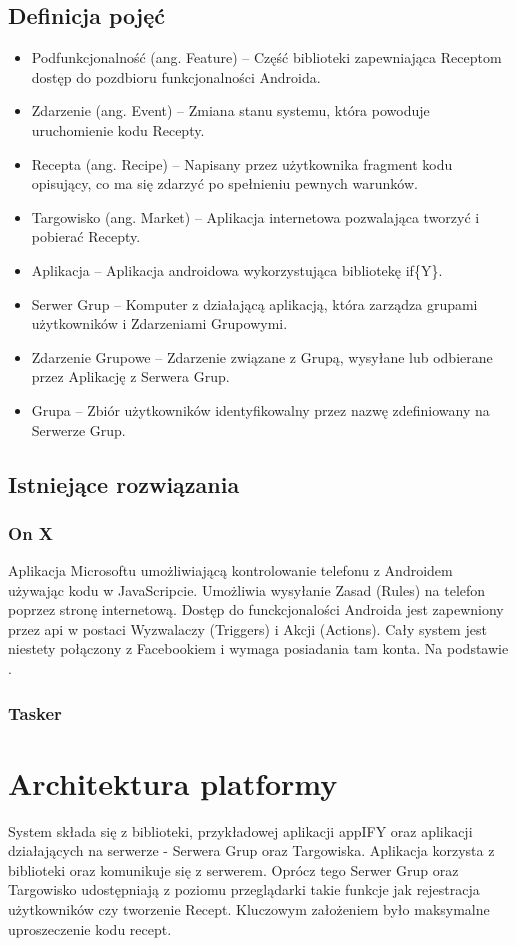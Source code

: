 \documentclass[11pt,a4paper,polish,thesis]{dcsbook}
\begin{document}
\section{Definicja pojęć}
\begin{itemize}
\item Podfunkcjonalność (ang. Feature) -- Część biblioteki zapewniająca Receptom dostęp do pozdbioru funkcjonalności Androida.
\item Zdarzenie (ang. Event) -- Zmiana stanu systemu, która powoduje uruchomienie kodu Recepty.
\item Recepta (ang. Recipe) -- Napisany przez użytkownika fragment kodu opisujący, co ma się zdarzyć po spełnieniu pewnych warunków.
\item Targowisko (ang. Market) -- Aplikacja internetowa pozwalająca tworzyć i pobierać Recepty.
\item Aplikacja -- Aplikacja androidowa wykorzystująca bibliotekę if\{Y\}. 
\item Serwer Grup -- Komputer z działającą aplikacją, która zarządza grupami użytkowników i Zdarzeniami Grupowymi.
\item Zdarzenie Grupowe -- Zdarzenie związane z Grupą, wysyłane lub odbierane przez Aplikację z Serwera Grup.
\item Grupa -- Zbiór użytkowników identyfikowalny przez nazwę zdefiniowany na Serwerze Grup.
\end{itemize}
\section{Istniejące rozwiązania}
\subsection{On X}
Aplikacja Microsoftu umożliwiającą kontrolowanie telefonu z Androidem używając kodu w JavaScripcie. Umożliwia wysyłanie Zasad (Rules) na telefon poprzez stronę internetową. Dostęp do funckcjonalości Androida jest zapewniony przez api w postaci Wyzwalaczy (Triggers) i Akcji (Actions). Cały system jest niestety połączony z Facebookiem i wymaga posiadania tam konta.
Na podstawie \cite{onx}.
\subsection{Tasker}

\chapter{Architektura platformy}
System składa się z biblioteki, przykładowej aplikacji appIFY oraz aplikacji działających na serwerze - Serwera Grup oraz Targowiska.
Aplikacja korzysta z biblioteki oraz komunikuje się z serwerem. Oprócz tego Serwer Grup oraz Targowisko udostępniają z poziomu przeglądarki takie funkcje jak rejestracja użytkowników czy tworzenie Recept. Kluczowym założeniem było maksymalne uproszeczenie kodu recept. 
\end{document}
